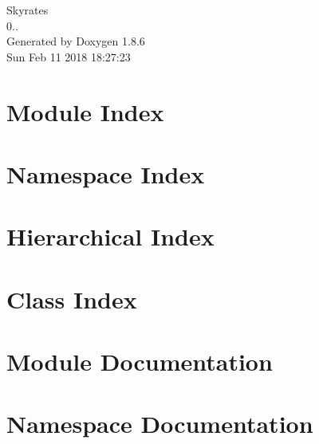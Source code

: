 \documentclass[twoside]{book}
\newcommand{\clearemptydoublepage}{%
  \newpage{\pagestyle{empty}\cleardoublepage}%
}
\begin{document}
\hypersetup{pageanchor=false}
\begin{titlepage}
\vspace*{7cm}
\begin{center}%
{\Large Skyrates \\[1ex]\large 0.. }\\
\vspace*{1cm}
{\large Generated by Doxygen 1.8.6}\\
\vspace*{0.5cm}
{\small Sun Feb 11 2018 18:27:23}\\
\end{center}
\end{titlepage}
\clearemptydoublepage
\tableofcontents
\clearemptydoublepage
{}
\hypersetup{pageanchor=true}

\chapter{Module Index}

\chapter{Namespace Index}

\chapter{Hierarchical Index}

\chapter{Class Index}

\chapter{Module Documentation}




\chapter{Namespace Documentation}





















\end{document}
